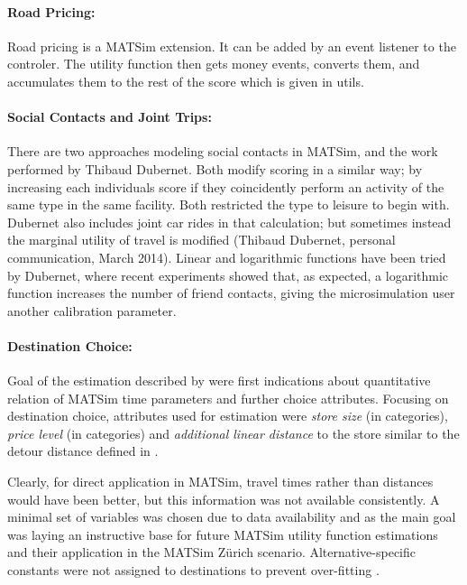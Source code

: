 \paragraph{Road Pricing:}
Road pricing is a MATSim extension. It can be added by an event listener to the controler. The utility function then gets money events, converts them, and accumulates them to the rest of the score which is given in utils.

\paragraph{Social Contacts and Joint Trips:}
There are two approaches modeling social contacts in MATSim, \citet[][]{Hackney_PhDThesis_2009} and the work performed by Thibaud Dubernet. Both modify scoring in a similar way; by increasing each individuals score if they coincidently perform an activity of the same type in the same facility. Both restricted the type to leisure to begin with. Dubernet also includes joint car rides in that calculation; but sometimes instead the marginal utility of travel is modified (Thibaud Dubernet, personal communication, March 2014). Linear and logarithmic functions have been tried by Dubernet, where recent experiments showed that, as expected, a logarithmic function increases the number of friend contacts, giving the microsimulation user another calibration parameter. 

\paragraph{Destination Choice:}
Goal of the estimation described by \citet[][]{Horni_PhDThesis_2013} were first indications about quantitative relation of MATSim time parameters and further choice attributes. Focusing on destination choice, attributes used for estimation were \emph{store size} (in categories), \emph{price level} (in categories) and \emph{additional linear distance} to the store similar to the detour distance defined in \citet[][]{ArentzeTimmermans_TRR_2007}.

Clearly, for direct application in MATSim, travel times rather than distances would have been better, but this information was not available consistently. A minimal set of variables was chosen due to data availability and as the main goal was laying an instructive base for future MATSim utility function estimations and their application in the MATSim Zürich scenario. Alternative-specific constants were not assigned to destinations to prevent over-fitting \citep[][]{BierlaireEtAl_TransScience_1997}.

